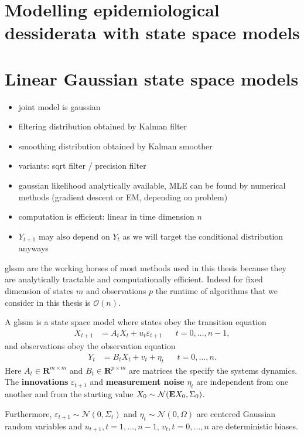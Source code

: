 \section{Modelling epidemiological dessiderata with state space models}
\label{sec:modelling_epidemiological_dessiderata_with_state_space_models}

\section{Linear Gaussian state space models}
\label{sec:linear_gaussian_state_space_models}

\begin{itemize}
    \item joint model is gaussian
    \item filtering distribution obtained by Kalman filter
    \item smoothing distribution obtained by Kalman smoother
    \item variants: sqrt filter / precision filter
    \item gaussian likelihood analytically available, MLE can be found by numerical methods (gradient descent or EM, depending on problem)
    \item computation is efficient: linear in time dimension $n$
    \item $Y_{t + 1}$ may also depend on $Y_{t}$ as we will target the conditional distribution anyways
\end{itemize}

\gls{glssm} are the working horses of most methods used in this thesis because they are analytically tractable and computationally efficient. Indeed for fixed dimension of states $m$ and observations $p$ the runtime of algorithms that we consider in this thesis is $\mathcal O(n)$.

\begin{definition}
    \label{def:glssm}
    A \gls{glssm} is a state space model where states obey the transition equation
    \begin{align}
        \label{eq:glssm_states}
        X_{t + 1} & = A_{t}X_{t} + u_{t} \varepsilon_{t + 1} &  & t = 0, \dots, n - 1,
    \end{align}
    and observations obey the observation equation
    \begin{align}
        \label{eq:glssm_observations}
        Y_{t} & = B_{t}X_{t} + v_{t} + \eta_{t} &  & t = 0, \dots, n.
    \end{align}
    Here $A_{t} \in \mathbf{R}^{m \times m}$ and $B_{t} \in \mathbf{R}^{p \times m}$ are matrices the specify the systems dynamics. The \textbf{innovations} $\varepsilon_{t + 1}$ and \textbf{measurement noise} $\eta_{t}$ are independent from one another and from the starting value $X_{0} \sim \mathcal N (\mathbf E X_{0}, \Sigma_{0})$.

    Furthermore, $\varepsilon_{t+1} \sim \mathcal N(0, \Sigma_{t})$ and $\eta_{t}\sim \mathcal N(0, \Omega)$ are centered Gaussian random variables and $u_{t + 1}, t = 1, \dots, n-1$, $v_{t}, t = 0, \dots, n$ are deterministic biases.
\end{definition}

